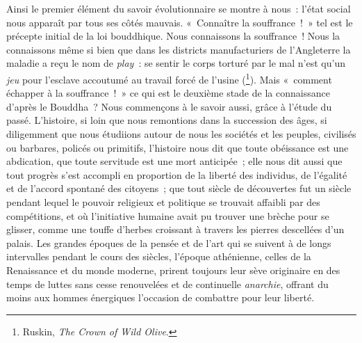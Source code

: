 \documentclass[french,twoside]{book} %
\begin{document}
Ainsi le premier élément du savoir évolutionnaire se montre à nous : l’état  social nous apparaît par tous ses côtés mauvais. « Connaître la souffrance ! » tel est le précepte initial de la loi bouddhique. Nous connaissons la souffrance ! Nous la connaissons même si bien que dans les districts manufacturiers de l’Angleterre la maladie a reçu le nom de \emph{play} : se sentir le corps torturé par le mal n’est qu’un \emph{jeu} pour l’esclave accoutumé au travail forcé de l’usine (\footnote{ \noindent Ruskin, \emph{The Crown of Wild Olive}. 
 }). Mais « comment échapper à la souffrance ! » ce qui est le deuxième stade de la connaissance d’après le Bouddha ? Nous commençons à le savoir aussi, grâce à l’étude du passé. L’histoire, si loin que nous remontions dans la succession des âges, si diligemment que nous étudiions autour de nous les sociétés et les peuples,  civilisés ou barbares, policés ou primitifs, l’histoire nous dit que toute obéissance est une abdication, que toute servitude est une mort anticipée ; elle nous dit aussi que tout progrès s’est accompli en proportion de la liberté des individus, de l’égalité et de l’accord spontané des citoyens ; que tout siècle de découvertes fut un siècle pendant lequel le pouvoir religieux et politique se trouvait affaibli par des compétitions, et où l’initiative humaine avait pu trouver une brèche pour se glisser, comme une touffe d’herbes croissant à travers les pierres descellées d’un palais. Les grandes époques de la pensée et de l’art qui se suivent à de longs intervalles pendant le cours des siècles, l’époque athénienne, celles de la Renaissance et du monde moderne, prirent  toujours leur sève originaire en des temps de luttes sans cesse renouvelées et de continuelle \emph{anarchie}, offrant du moins aux hommes énergiques l’occasion de combattre pour leur liberté.\par
\end{document}

